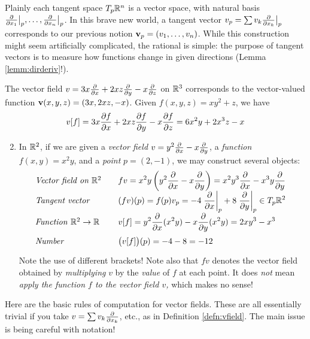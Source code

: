 Plainly each tangent space $T_p\R^n$ is a vector space, with natural basis $\smash[b]{\partials{x_1}\big|_p,\ldots,\partials{x_n}\big|_p}$. In this brave new world, a tangent vector $v_p=\sum v_k\partials{x_k}\big|_p$ corresponds to our previous notion $\vv_p=(v_1,\ldots,v_n)$. While this construction might seem artificially complicated, the rational is simple: the purpose of tangent vectors is to measure how functions change in given directions (Lemma \ref{lemm:dirderiv}!).


\begin{examples}{}{}
\exstart The vector field $v=3x\partials{x}+2xz\partials{y}-x\partials{z}$ on $\R^3$ corresponds to the vector-valued function $\vv(x,y,z)=(3x,2xz,-x)$. Given $f(x,y,z)=xy^2+z$, we have
	\[v[f]=3x\partials[f]{x}+2xz\partials[f]{y}-x\partials[f]{z}=6x^2y+2x^3z-x\]
	
\begin{enumerate}\setcounter{enumi}{1}
	\item In $\R^2$, if we are given a \emph{vector field} $v=y^2\partials{x}-x\partials{y}$, a \emph{function} $f(x,y)=x^2y$, and a \emph{point} $p=(2,-1)$, we may construct several objects:
	\[\def\arraystretch{1.7}
	\begin{array}{@{}l@{\qquad}l}
	\text{\emph{Vector field on $\R^2$}} & \displaystyle fv=x^2y\left(y^2\partials{x}-x\partials{y}\right) =x^2y^3\partials{x}-x^3y\partials{y} \\
 	\text{\emph{Tangent vector}} & \displaystyle (fv)(p)=f(p) v_p=-4\partialsat{x}p+8\partialsat{y}p \in T_p\R^2 \\
	\text{\emph{Function} $\R^2\to\R$} & \displaystyle v[f]=y^2\partials{x}(x^2y)-x\partials{y}(x^2y)=2xy^3-x^3 \\
 	\text{\emph{Number}} & \displaystyle \bigl(v[f]\bigr)(p)=-4-8=-12
	\end{array}
	\]
	Note the use of different brackets! Note also that $fv$ denotes the vector field obtained by \emph{multiplying} $v$ by the \emph{value} of $f$ at each point. It does \emph{not} mean \emph{apply the function $f$ to the vector field $v$,} which makes no sense!
\end{enumerate}
\end{examples}

\goodbreak

Here are the basic rules of computation for vector fields. These are all essentially trivial if you take $v=\sum v_k\partials{x_k}$, etc., as in Definition \ref{defn:vfield}. The main issue is being careful with notation!

